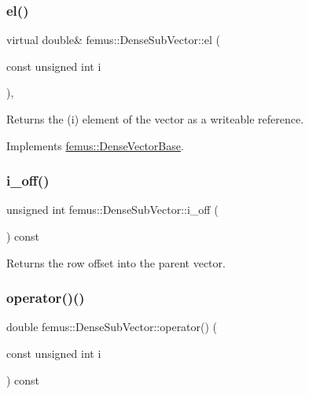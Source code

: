 \subsubsection{\texorpdfstring{el()}{el()}\hspace{0.1cm}{\footnotesize\ttfamily [2/2]}}
{\footnotesize\ttfamily virtual double\& femus\+::\+Dense\+Sub\+Vector\+::el (\begin{DoxyParamCaption}\item[{const unsigned int}]{i }\end{DoxyParamCaption})\hspace{0.3cm}{\ttfamily [inline]}, {\ttfamily [virtual]}}

\begin{DoxyReturn}{Returns}
the {\ttfamily }(i) element of the vector as a writeable reference. 
\end{DoxyReturn}


Implements \mbox{\hyperlink{classfemus_1_1_dense_vector_base_a521863934215d5f43225004b091864f5}{femus\+::\+Dense\+Vector\+Base}}.

\mbox{\label{classfemus_1_1_dense_sub_vector_afd7cee05ce11a2c32a8696386eb0b206}} 
\subsubsection{\texorpdfstring{i\+\_\+off()}{i\_off()}}
{\footnotesize\ttfamily unsigned int femus\+::\+Dense\+Sub\+Vector\+::i\+\_\+off (\begin{DoxyParamCaption}{ }\end{DoxyParamCaption}) const\hspace{0.3cm}{\ttfamily [inline]}}

\begin{DoxyReturn}{Returns}
the row offset into the parent vector. 
\end{DoxyReturn}
\mbox{\label{classfemus_1_1_dense_sub_vector_ad342710f5d826cff8b5b87dd5e7f1091}} 
\subsubsection{\texorpdfstring{operator()()}{operator()()}\hspace{0.1cm}{\footnotesize\ttfamily [1/2]}}
{\footnotesize\ttfamily double femus\+::\+Dense\+Sub\+Vector\+::operator() (\begin{DoxyParamCaption}\item[{const unsigned int}]{i }\end{DoxyParamCaption}) const\hspace{0.3cm}{\ttfamily [inline]}}

